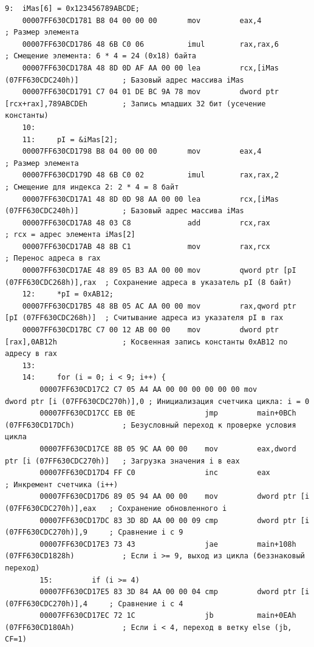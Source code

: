 \documentclass[14pt, a4paper]{extarticle}
\begin{document}
\begin{lstlisting}[language={[x86masm]Assembler}, caption={Дизассемблированный код с сопоставлением инструкциям Си}]
	9: 	iMas[6] = 0x123456789ABCDE;
	00007FF630CD1781 B8 04 00 00 00       mov         eax,4                                ; Размер элемента
	00007FF630CD1786 48 6B C0 06          imul        rax,rax,6                            ; Смещение элемента: 6 * 4 = 24 (0x18) байта
	00007FF630CD178A 48 8D 0D AF AA 00 00 lea         rcx,[iMas (07FF630CDC240h)]          ; Базовый адрес массива iMas
	00007FF630CD1791 C7 04 01 DE BC 9A 78 mov         dword ptr [rcx+rax],789ABCDEh        ; Запись младших 32 бит (усечение константы)
	10: 
	11: 	pI = &iMas[2];
	00007FF630CD1798 B8 04 00 00 00       mov         eax,4                                ; Размер элемента
	00007FF630CD179D 48 6B C0 02          imul        rax,rax,2                            ; Смещение для индекса 2: 2 * 4 = 8 байт
	00007FF630CD17A1 48 8D 0D 98 AA 00 00 lea         rcx,[iMas (07FF630CDC240h)]          ; Базовый адрес массива iMas
	00007FF630CD17A8 48 03 C8             add         rcx,rax                              ; rcx = адрес элемента iMas[2]
	00007FF630CD17AB 48 8B C1             mov         rax,rcx                              ; Перенос адреса в rax
	00007FF630CD17AE 48 89 05 B3 AA 00 00 mov         qword ptr [pI (07FF630CDC268h)],rax  ; Сохранение адреса в указатель pI (8 байт)
	12: 	*pI = 0xAB12;
	00007FF630CD17B5 48 8B 05 AC AA 00 00 mov         rax,qword ptr [pI (07FF630CDC268h)]  ; Считывание адреса из указателя pI в rax
	00007FF630CD17BC C7 00 12 AB 00 00    mov         dword ptr [rax],0AB12h               ; Косвенная запись константы 0xAB12 по адресу в rax
	13: 
	14: 	for (i = 0; i < 9; i++) {
		00007FF630CD17C2 C7 05 A4 AA 00 00 00 00 00 00 mov         dword ptr [i (07FF630CDC270h)],0 ; Инициализация счетчика цикла: i = 0
		00007FF630CD17CC EB 0E                jmp         main+0BCh (07FF630CD17DCh)           ; Безусловный переход к проверке условия цикла
		00007FF630CD17CE 8B 05 9C AA 00 00    mov         eax,dword ptr [i (07FF630CDC270h)]   ; Загрузка значения i в eax
		00007FF630CD17D4 FF C0                inc         eax                                  ; Инкремент счетчика (i++)
		00007FF630CD17D6 89 05 94 AA 00 00    mov         dword ptr [i (07FF630CDC270h)],eax   ; Сохранение обновленного i
		00007FF630CD17DC 83 3D 8D AA 00 00 09 cmp         dword ptr [i (07FF630CDC270h)],9     ; Сравнение i с 9
		00007FF630CD17E3 73 43                jae         main+108h (07FF630CD1828h)           ; Если i >= 9, выход из цикла (беззнаковый переход)
		15: 		if (i >= 4)
		00007FF630CD17E5 83 3D 84 AA 00 00 04 cmp         dword ptr [i (07FF630CDC270h)],4     ; Сравнение i с 4
		00007FF630CD17EC 72 1C                jb          main+0EAh (07FF630CD180Ah)           ; Если i < 4, переход в ветку else (jb, CF=1)

\end{lstlisting}
\end{document}
